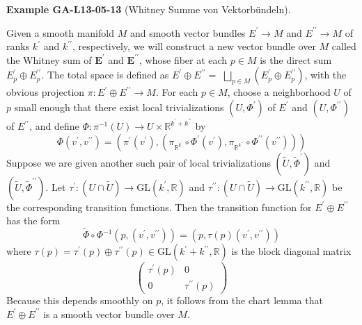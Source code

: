 \documentclass[10pt, letterpaper]{article}
\newcommand{\CustomHeading}[3]{%
  \par\medskip\noindent%
  \textbf{#1 #2} \textnormal{(#3)}.\enskip%
}
\newenvironment{EXA}[2]{\begin{unitbox}\CustomHeading{Example}{#1}{#2}}{\end{unitbox}}
\begin{document}
\begin{EXA}{GA-L13-05-13}{Whitney Summe von Vektorbündeln}
Given a smooth manifold $M$ and smooth vector bundles $E^{\prime} \rightarrow M$ and $E^{\prime \prime} \rightarrow M$ of ranks $k^{\prime}$ and $k^{\prime \prime}$, respectively, we will construct a new vector bundle over $M$ called the Whitney sum of $\boldsymbol{E}^{\prime}$ and $\boldsymbol{E}^{\prime \prime}$, whose fiber at each $p \in M$ is the direct sum $E_{p}^{\prime} \oplus E_{p}^{\prime \prime}$. The total space is defined as $E^{\prime} \oplus E^{\prime \prime}=$ $\bigsqcup_{p \in M}\left(E_{p}^{\prime} \oplus E_{p}^{\prime \prime}\right)$, with the obvious projection $\pi: E^{\prime} \oplus E^{\prime \prime} \rightarrow M$. For each $p \in M$, choose a neighborhood $U$ of $p$ small enough that there exist local trivializations $\left(U, \Phi^{\prime}\right)$ of $E^{\prime}$ and $\left(U, \Phi^{\prime \prime}\right)$ of $E^{\prime \prime}$, and define $\Phi: \pi^{-1}(U) \rightarrow U \times \mathbb{R}^{k^{\prime}+k^{\prime \prime}}$ by
$$
\Phi\left(v^{\prime}, v^{\prime \prime}\right)=\left(\pi^{\prime}\left(v^{\prime}\right),\left(\pi_{\mathbb{R}^{k^{\prime}}} \circ \Phi^{\prime}\left(v^{\prime}\right), \pi_{\mathbb{R}^{k^{\prime \prime}}} \circ \Phi^{\prime \prime}\left(v^{\prime \prime}\right)\right)\right)
$$
Suppose we are given another such pair of local trivializations $\left(\tilde{U}, \tilde{\Phi}^{\prime}\right)$ and $\left(\tilde{U}, \widetilde{\Phi}^{\prime \prime}\right)$. Let $\tau^{\prime}:(U \cap \tilde{U}) \rightarrow \mathrm{GL}\left(k^{\prime}, \mathbb{R}\right)$ and $\tau^{\prime \prime}:(U \cap \tilde{U}) \rightarrow \mathrm{GL}\left(k^{\prime \prime}, \mathbb{R}\right)$ be the corresponding transition functions. Then the transition function for $E^{\prime} \oplus E^{\prime \prime}$ has the form
$$
\widetilde{\Phi} \circ \Phi^{-1}\left(p,\left(v^{\prime}, v^{\prime \prime}\right)\right)=\left(p, \tau(p)\left(v^{\prime}, v^{\prime \prime}\right)\right)
$$
where $\tau(p)=\tau^{\prime}(p) \oplus \tau^{\prime \prime}(p) \in \mathrm{GL}\left(k^{\prime}+k^{\prime \prime}, \mathbb{R}\right)$ is the block diagonal matrix
$$
\left(\begin{array}{cc}
\tau^{\prime}(p) & 0 \\
0 & \tau^{\prime \prime}(p)
\end{array}\right)
$$
Because this depends smoothly on $p$, it follows from the chart lemma that $E^{\prime} \oplus E^{\prime \prime}$ is a smooth vector bundle over $M$.
\end{EXA}
\end{document}
